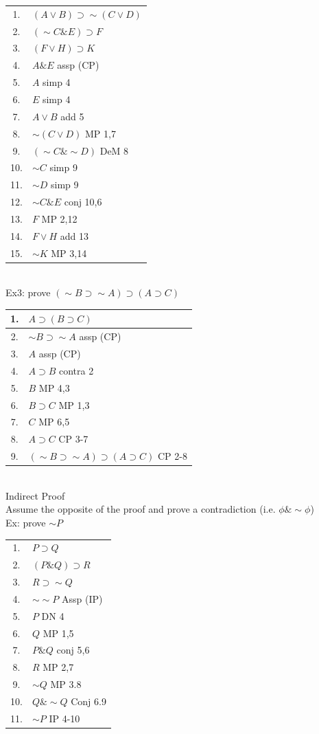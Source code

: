 \documentclass[11pt, fleqn]{article}
\begin{document}
\begin{tabular}{cl}
    1. & $(A\vee B)\supset\sim(C\vee D)$\\
    2. & $(\sim C\& E)\supset F$\\
    3. & $(F\vee H)\supset K$\\
    \hline
    4. & $A\& E$ assp (CP)\\
    5. & $A$ simp 4\\
    6. & $E$ simp 4\\
    7. & $A\vee B$ add 5\\
    8. & $\sim(C\vee D)$ MP 1,7\\
    9. & $(\sim C\&\sim D)$ DeM 8\\
    10. & $\sim C$ simp 9\\
    11. & $\sim D$ simp 9\\
    12. & $\sim C\& E$ conj 10,6\\
    13. & $F$ MP 2,12\\
    14. & $F\vee H$ add 13\\
    15. & $\sim K$ MP 3,14
\end{tabular}\\
Ex3: prove $(\sim B\supset\sim A)\supset(A\supset C)$\\
\begin{tabular}{cl}
    1. & $A\supset(B\supset C)$\\
    \hline
    2. & $\sim B\supset\sim A$ assp (CP)\\
    3. & $A$ assp (CP)\\
    4. & $A\supset B$ contra 2\\
    5. & $B$ MP 4,3\\
    6. & $B\supset C$ MP 1,3\\
    7. & $C$ MP 6,5\\
    8. & $A\supset C$ CP 3-7\\
    9. & $(\sim B\supset\sim A)\supset(A\supset C)$ CP 2-8
\end{tabular}\\

Indirect Proof\\
Assume the opposite of the proof and prove a contradiction (i.e. $\phi\&\sim\phi$)\\
Ex: prove $\sim P$\\
\begin{tabular}{cl}
    1. & $P\supset Q$\\
    2. & $(P\& Q)\supset R$\\
    3. & $R\supset \sim Q$\\
    \hline
    4. & $\sim\sim P$ Assp (IP)\\
    5. & $P$ DN 4\\
    6. & $Q$ MP 1,5\\
    7. & $P\& Q$ conj 5,6\\
    8. & $R$ MP 2,7\\
    9. & $\sim Q$ MP 3.8\\
    10. & $Q\&\sim Q$ Conj 6.9\\
    11. & $\sim P$ IP 4-10
\end{tabular}
\end{document}
